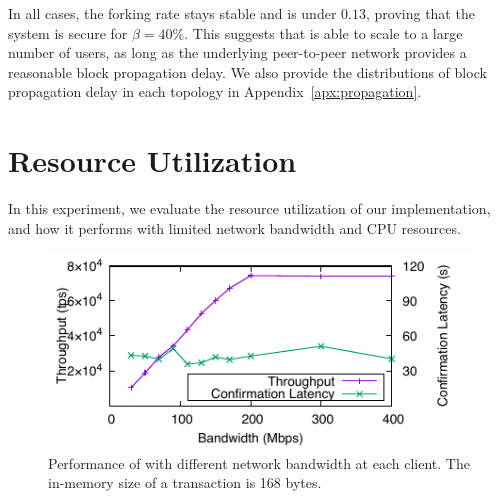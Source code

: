 In all cases, the forking rate stays stable and is under $0.13$, proving that the system is secure for $\beta=40\%$. This suggests that \prism is able to scale to a large number of users, as long as the underlying peer-to-peer network provides a reasonable block propagation delay. We also provide the distributions of block propagation delay in each topology in Appendix~\ref{apx:propagation}.

\section{Resource Utilization}
\label{sec:eval-resource}

In this experiment, we evaluate the resource utilization of our \prism implementation, and how it performs with limited network bandwidth and CPU resources. 





\begin{figure}
    \centering
    \includegraphics{figures/resource-fig-bw.pdf}
    \caption{\small Performance of \prism with different network bandwidth at each client. The in-memory size of a transaction is 168 bytes.}
    \label{fig:bw}
\end{figure}

